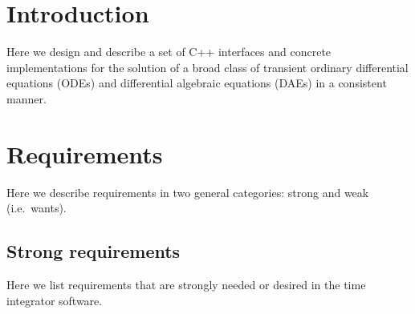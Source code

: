 \documentclass[pdf,ps2pdf,11pt]{SANDreport}
\begin{document}

%
\setcounter{secnumdepth}{3}
\SANDmain %

\section{Introduction}

Here we design and describe a set of C++ interfaces and concrete
implementations for the solution of a broad class of transient ordinary
differential equations (ODEs) and differential algebraic equations (DAEs) in a
consistent manner.

\section{Requirements}

Here we describe requirements in two general categories: strong and weak
(i.e.\ wants).

\subsection{Strong requirements}

Here we list requirements that are strongly needed or desired in the time
integrator software.
\end{document}
